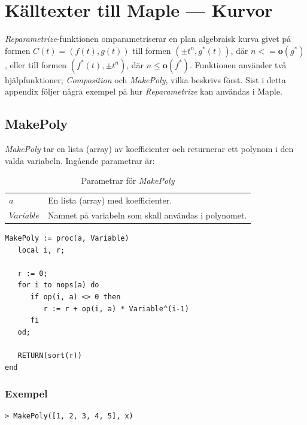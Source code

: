 \chapter[Källtexter --- Kurvor]{Källtexter till Maple --- Kurvor}
\label{Reparametrize}

\emph{Reparametrize}-funktionen omparametriserar en plan algebraisk kurva givet på formen $C(t) = (f(t), g(t))$ till formen $(\pm t^n, g^*(t))$, där $n <= \mathbf{o}(g^*)$, eller till formen $(f^*(t), \pm t^n)$, där $n \leq \mathbf{o}(f^*)$. Funktionen använder två hjälpfunktioner; \emph{Composition} och \emph{MakePoly}, vilka beskrivs först. Sist i detta appendix följer några exempel på hur \emph{Reparametrize} kan användas i Maple.

\section{MakePoly}

\emph{MakePoly} tar en lista (array) av koefficienter och returnerar ett polynom i den valda variabeln. Ingående parametrar är:

\begin{table}[h]
\caption{Parametrar för \emph{MakePoly}}
\begin{center}
\begin{tabular}{|l|l|}
\hline
$a$ & En lista (array) med koefficienter.\\
$Variable$ & Namnet på variabeln som skall användas i polynomet.\\
\hline
\end{tabular}
\end{center}
\end{table}

\begin{verbatim}
MakePoly := proc(a, Variable)
   local i, r;

   r := 0;
   for i to nops(a) do 
      if op(i, a) <> 0 then
         r := r + op(i, a) * Variable^(i-1)
      fi
   od;

   RETURN(sort(r))
end\end{verbatim}

\subsection{Exempel}

\begin{maplegroup}
\begin{verbatim}
> MakePoly([1, 2, 3, 4, 5], x)
\end{verbatim}
\mapleresult
\begin{maplelatex}
\end{maplelatex}
\end{maplegroup}

